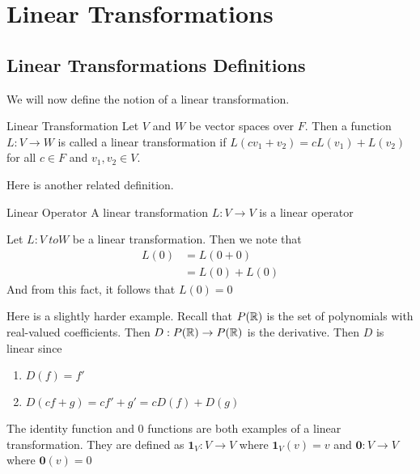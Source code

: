 \documentclass[main.tex]{subfiles}
\begin{document}
    \chapter{Linear Transformations}

    \section{Linear Transformations Definitions}
    We will now define the notion of a linear transformation. 
    \begin{defn}{Linear Transformation}{}
        Let $V$ and $W$ be vector spaces over $F$. Then a function $L: V\to W$ is called a linear transformation if $L(cv_1 + v_2) = cL(v_1) + L(v_2)$ for all $c\in F$ and $v_1,v_2\in V$.
    \end{defn}

    Here is another related definition. 
    \begin{defn}{Linear Operator}{}
        A linear transformation $L:V\to V$ is a linear operator
    \end{defn}

    \begin{example}{}{}
        Let $L:V\ to W$ be a linear transformation. Then we note that 
        \begin{align*}
            L(0) &= L(0 + 0) \\
            &= L(0) + L(0)
        \end{align*}
        And from this fact, it follows that $L(0)=0$
    \end{example}

    \begin{example}{}{}
        Here is a slightly harder example. Recall that $P(\mathbb{R})$ is the set of polynomials with real-valued coefficients. Then $D: P(\mathbb{R}) \to P(\mathbb{R})$ is the derivative. Then $D$ is linear since 
        \begin{enumerate}
            \item $D(f) = f'$
            \item $D(cf + g) = cf' + g' = cD(f) + D(g)$
        \end{enumerate}
    \end{example}

    \begin{example}{}{}
        The identity function and 0 functions are both examples of a linear transformation. They are defined as $\mathbf{1}_V: V\to V$ where $\mathbf{1}_V(v) = v$ and $\mathbf{0} : V\to V$ where $\mathbf{0}(v) = 0$
    \end{example}
\end{document}
